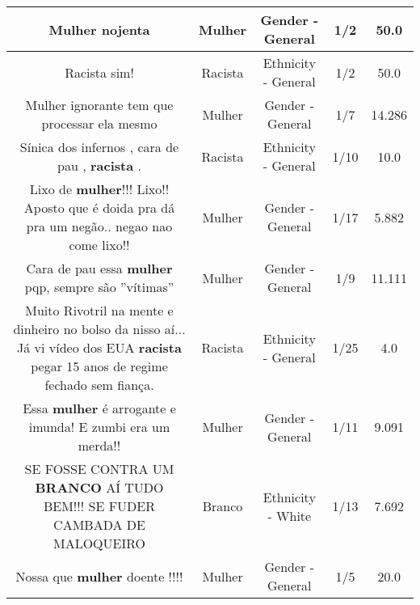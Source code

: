 \documentclass[11pt]{article}
\newlength\mylength
\begin{document}
\begin{center}
\begin{longtable}{|C{.65\mylength}|C{.30\mylength}|C{.12\mylength}|C{.12\mylength}|C{.12\mylength}|}
  \small Mulher nojenta\normalsize   & Mulher & Gender - General & 1/2 & 50.0 \\  \hline
  \small Racista  sim!\normalsize   & Racista & Ethnicity - General & 1/2 & 50.0 \\  \hline
  \small Mulher ignorante tem que processar ela mesmo\normalsize   & Mulher & Gender - General & 1/7 & 14.286 \\  \hline
  \small Sínica  dos infernos , cara de pau , \textbf{racista} .\normalsize   & Racista & Ethnicity - General & 1/10 & 10.0 \\  \hline
  \small Lixo de \textbf{mulher}!!! Lixo!! Aposto que é doida pra dá pra um negão.. negao nao come lixo!!\normalsize   & Mulher & Gender - General & 1/17 & 5.882 \\  \hline
  \small Cara de pau essa \textbf{mulher} pqp, sempre são ''vítimas''\normalsize   & Mulher & Gender - General & 1/9 & 11.111 \\  \hline
  \small Muito Rivotril na mente e dinheiro no bolso da nisso aí... Já vi vídeo dos EUA \textbf{racista} pegar 15 anos de regime fechado sem fiança.\normalsize   & Racista & Ethnicity - General & 1/25 & 4.0 \\  \hline
  \small Essa \textbf{mulher} é arrogante e imunda! E zumbi era um merda!!\normalsize   & Mulher & Gender - General & 1/11 & 9.091 \\  \hline
  \small SE FOSSE CONTRA UM \textbf{BRANCO} AÍ TUDO BEM!!! SE FUDER CAMBADA DE MALOQUEIRO\normalsize   & Branco & Ethnicity - White & 1/13 & 7.692 \\  \hline
  \small Nossa que \textbf{mulher} doente !!!!\normalsize   & Mulher & Gender - General & 1/5 & 20.0 \\  \hline

\end{longtable}
\end{center}
\end{document}
